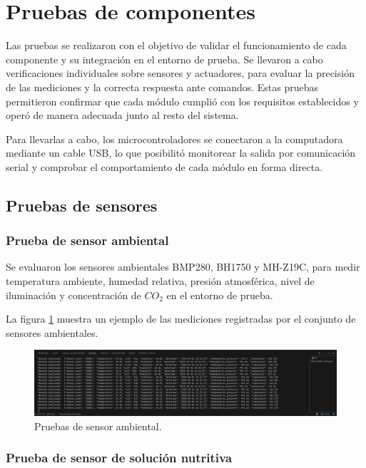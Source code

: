 \section{Pruebas de componentes}

Las pruebas se realizaron con el objetivo de validar el funcionamiento de cada
componente y su integración en el entorno de prueba. Se llevaron a cabo
verificaciones individuales sobre sensores y actuadores, para evaluar la
precisión de las mediciones y la correcta respuesta ante comandos. Estas
pruebas permitieron confirmar que cada módulo cumplió con los requisitos
establecidos y operó de manera adecuada junto al resto del sistema.

Para llevarlas a cabo, los microcontroladores se conectaron a la computadora
mediante un cable USB, lo que posibilitó monitorear la salida por comunicación
serial y comprobar el comportamiento de cada módulo en forma directa.

\subsection{Pruebas de sensores}

\subsubsection{Prueba de sensor ambiental}

Se evaluaron los sensores ambientales BMP280, BH1750 y MH-Z19C, para medir
temperatura ambiente, humedad relativa, presión atmosférica, nivel de
iluminación y concentración de $CO_2$ en el entorno de prueba.

La figura \ref{fig:medicion_sensor_ambiental} muestra un ejemplo de las
mediciones registradas por el conjunto de sensores ambientales.

\begin{figure}[H]
    \centering
    \includegraphics[width=\textwidth]{Images/51_sensor_ambiental.png}
    \caption[Pruebas de sensor ambiental]{Pruebas de sensor ambiental.}
    \label{fig:medicion_sensor_ambiental}
\end{figure}

\subsubsection{Prueba de sensor de solución nutritiva}

